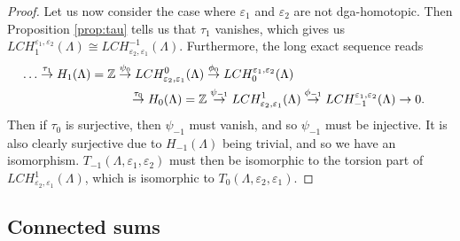 \documentclass[11pt]{amsart}
\theoremstyle{plain}
\theoremstyle{remark}
\numberwithin{equation}{section}
\newcommand{\Z}{\ensuremath{\mathbb{Z}}}
\begin{document}
\begin{proof}
Let us now consider the case where $\varepsilon_1$ and $\varepsilon_2$ are not dga-homotopic. Then Proposition \ref{prop:tau} tells us that $\tau_1$ vanishes, which gives us $LCH^{\varepsilon_1,\varepsilon_2}_1(\Lambda)\cong LCH^{-1}_{\varepsilon_2,\varepsilon_1}(\Lambda)$. Furthermore, the long exact sequence reads 
 \begin{align*}
\lefteqn{\ldots \overset{\tau_1}\rightarrow H_1(\Lambda) = \Z \overset{\psi_0}\rightarrow LCH^{0}_{\varepsilon_2,\varepsilon_1}(\Lambda)  \overset{\phi_0}\rightarrow LCH_{0}^{\varepsilon_1,\varepsilon_2}(\Lambda)} \\
& \hspace{3cm} \overset{\tau_0}\rightarrow H_{0}(\Lambda) = \Z\overset{\psi_{-1}}\rightarrow LCH^{1}_{\varepsilon_2,\varepsilon_1}(\Lambda)  \overset{\phi_{-1}}\rightarrow LCH_{-1}^{\varepsilon_1,\varepsilon_2}(\Lambda)\rightarrow0.
\end{align*}
Then if $\tau_0$ is surjective, then $\psi_{-1}$ must vanish, and so $\psi_{-1}$ must be injective. It is also clearly surjective due to $H_{-1}(\Lambda)$ being trivial, and so we have an isomorphism. $T_{-1}(\Lambda,\varepsilon_1,\varepsilon_2)$ must then be isomorphic to the torsion part of $LCH^{1}_{\varepsilon_2,\varepsilon_1}(\Lambda) $, which is isomorphic to $T_{0}(\Lambda,\varepsilon_2,\varepsilon_1)$.
\end{proof}

\subsection{Connected sums}
\label{sec:connsum}
\end{document}
